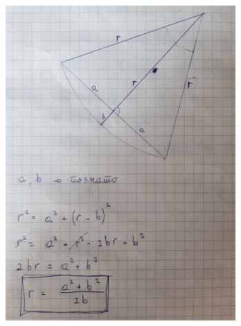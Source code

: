 \documentclass[12pt]{article}
\begin{document}
\begin{center}
    \centering 
    \includegraphics[height=12cm, width=10cm]{images/detect4.jpg}
\end{center}
\vspace{0.5cm}
\end{document}
